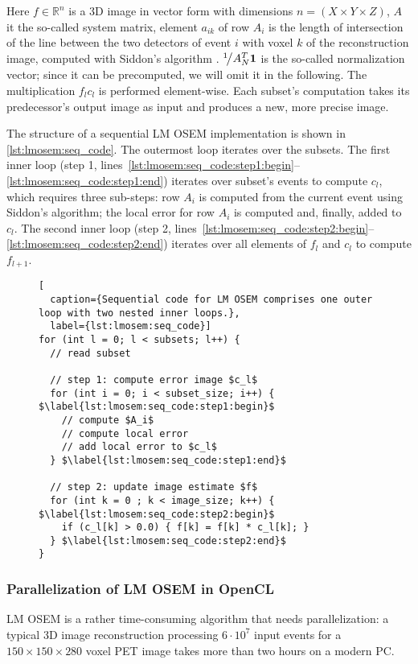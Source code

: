 Here $f \in \mathbb{R}^n$ is a 3D image in vector form with dimensions $n = (X \times Y \times Z)$, $A$ it the so-called system matrix, element $a_{ik}$ of row $A_i$ is the length of intersection of the line between the two detectors of event $i$ with voxel $k$ of the reconstruction image, computed with Siddon's algorithm \cite{Siddon1985}.
${}^{1}\!\big/{A_N^T \textbf{1}}$ is the so-called normalization vector; since it can be precomputed, we will omit it in the following.
The multiplication $f_{l}c_{l}$ is performed element-wise.
Each subset's computation takes its predecessor's output image as input and produces a new, more precise image.

The structure of a sequential LM OSEM implementation is shown in \autoref{lst:lmosem:seq_code}.
The outermost loop iterates over the subsets.
The first inner loop (step 1, lines~\autoref{lst:lmosem:seq_code:step1:begin}--\autoref{lst:lmosem:seq_code:step1:end}) iterates over subset's events to compute $c_l$, which requires three sub-steps:
row $A_i$ is computed from the current event using Siddon's algorithm;
the local error for row $A_i$ is computed and, finally, added to $c_l$.
The second inner loop (step 2, lines~\autoref{lst:lmosem:seq_code:step2:begin}--\autoref{lst:lmosem:seq_code:step2:end}) iterates over all elements of $f_l$ and $c_l$ to compute $f_{l+1}$.
\begin{figure}
\begin{lstlisting}[
  caption={Sequential code for LM OSEM comprises one outer loop with two nested inner loops.},
  label={lst:lmosem:seq_code}]
for (int l = 0; l < subsets; l++) {
  // read subset

  // step 1: compute error image $c_l$
  for (int i = 0; i < subset_size; i++) { $\label{lst:lmosem:seq_code:step1:begin}$
    // compute $A_i$
    // compute local error
    // add local error to $c_l$
  } $\label{lst:lmosem:seq_code:step1:end}$

  // step 2: update image estimate $f$
  for (int k = 0 ; k < image_size; k++) { $\label{lst:lmosem:seq_code:step2:begin}$
    if (c_l[k] > 0.0) { f[k] = f[k] * c_l[k]; }
  } $\label{lst:lmosem:seq_code:step2:end}$
}
\end{lstlisting}
\end{figure}

\subsubsection{Parallelization of LM OSEM in OpenCL}
\label{sec:parallel_implementation}
LM OSEM is a rather time-consuming algorithm that needs parallelization:
a typical 3D image reconstruction processing $6 \cdot 10^7$ input events for a $150 \times 150 \times 280$ voxel PET image takes more than two hours on a modern PC.

